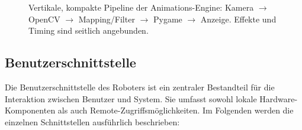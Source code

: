 \begin{figure}[ht]
	\caption{Vertikale, kompakte Pipeline der Animations-Engine: Kamera \(\rightarrow\) OpenCV \(\rightarrow\) Mapping/Filter \(\rightarrow\) Pygame \(\rightarrow\) Anzeige. Effekte und Timing sind seitlich angebunden.}
	\label{fig:animations_pipeline_vertical_plain}
\end{figure}
\newpage

\subsection{Benutzerschnittstelle}
\label{cha:Benutzerschnittstelle}

Die Benutzerschnittstelle des Roboters ist ein zentraler Bestandteil für die Interaktion zwischen Benutzer und System. Sie umfasst sowohl lokale Hardware-Komponenten als auch Remote-Zugriffsmöglichkeiten. Im Folgenden werden die einzelnen Schnittstellen ausführlich beschrieben:

